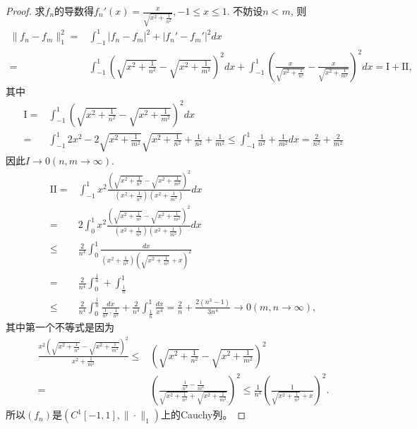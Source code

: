 \documentclass[a4paper,8pt]{ctexart}\textwidth 140mm \textheight 216mm
\newcommand{\8}{\infty}
\begin{document}
\begin{proof}
    求$f_n$的导数得$f_n'(x)=\frac{x}{\sqrt{x^2+\frac{1}{n^2}}},-1\leq x\leq 1$. 不妨设$n<m$, 则
    \begin{equation*}
    \begin{split}
    \|f_n-f_m\|_1^2=&\int_{-1}^1|f_n-f_m|^2+|f_n'-f_m'|^2dx\\
                   =&\int_{-1}^1(\sqrt{x^2+\frac{1}{n^2}}-\sqrt{x^2+\frac{1}{m^2}})^2dx+\int_{-1}^1(\frac{x}{\sqrt{x^2+\frac{1}{n^2}}}-\frac{x}{\sqrt{x^2+\frac{1}{m^2}}})^2dx=\mathrm{I}+\mathrm{II},
    \end{split}
    \end{equation*}
    其中
    \begin{equation*}
    \begin{split}
     \mathrm{I}=&\int_{-1}^1 (\sqrt{x^2+\frac{1}{n^2}}-\sqrt{x^2+\frac{1}{m^2}})^2dx\\
     =&\int_{-1}^1 2x^2-2\sqrt{x^2+\frac{1}{m^2}}\sqrt{x^2+\frac{1}{n^2}}+\frac{1}{n^2}+\frac{1}{m^2}\leq \int_{-1}^1\frac{1}{n^2}+\frac{1}{m^2}dx=\frac{2}{n^2}+\frac{2}{m^2}
    \end{split}
    \end{equation*}
    因此$I\to0(n,m\to\infty)$. 
    \begin{equation*}
    \begin{split}
        	\mathrm{II}=&\int_{-1}^1x^2\frac{(\sqrt{x^2+\frac{1}{n^2}}-\sqrt{x^2+\frac{1}{m^2}})^2}{(x^2+\frac{1}{n^2})(x^2+\frac{1}{m^2})}dx\\
        	=&2\int_{0}^1x^2\frac{(\sqrt{x^2+\frac{1}{n^2}}-\sqrt{x^2+\frac{1}{m^2}})^2}{(x^2+\frac{1}{n^2})(x^2+\frac{1}{m^2})}dx\\
        	\leq&\frac{2}{n^4}\int_0^1 \frac{dx}{(x^2+\frac{1}{n^2})(\sqrt{x^2+\frac{1}{n^2}}+x)^2}\\
        	=& \frac{2}{n^4}\int_0^{\frac{1}{n}}+\int_{\frac{1}{n}}^1\\
        	\leq & \frac{2}{n^4}\int_0^{\frac{1}{n}}\frac{dx}{\frac{1}{n^2}\cdot\frac{1}{n^2}}+\frac{2}{n^4}\int_{\frac{1}{n}}^1\frac{dx}{x^4}=\frac{2}{n}+\frac{2(n^3-1)}{3n^4}\to 0(m,n\to\infty),
    \end{split}
    \end{equation*}
    其中第一个不等式是因为
    \begin{equation*}
    \begin{split}
        	\frac{x^2(\sqrt{x^2+\frac{1}{n^2}}-\sqrt{x^2+\frac{1}{m^2}})^2}{x^2+\frac{1}{m^2}}\leq& \left(\sqrt{x^2+\frac{1}{n^2}}-\sqrt{x^2+\frac{1}{m^2}}\right)^2\\
        	=&\left(\frac{\frac{1}{n^2}-\frac{1}{m^2}}{\sqrt{x^2+\frac{1}{n^2}}+\sqrt{x^2+\frac{1}{m^2}}}\right)^2\leq \frac{1}{n^4}\left(\frac{1}{\sqrt{x^2+\frac{1}{n^2}}+x}\right)^2.
    \end{split}
    \end{equation*}
    所以$(f_n)$是$(C^1[-1,1],\|\cdot\|_1)$上的Cauchy列。
    

\end{proof}
\end{document}

